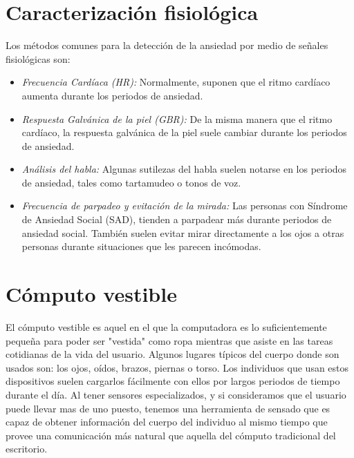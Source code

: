 \documentclass[letterpaper,12pt]{cicese}
\begin{document}
			\section{Caracterizaci\'on fisiol\'ogica}
				Los m\'etodos comunes para la detecci\'on de la ansiedad  por medio de se\~nales fisiol\'ogicas son: 
					\begin{itemize}
						\item \emph{Frecuencia Card\'iaca (HR):} Normalmente, suponen que el ritmo card\'iaco aumenta durante los periodos de ansiedad. 
						\item \emph{Respuesta Galv\'anica de la piel (GBR):} De la misma manera que el ritmo card\'iaco, la respuesta galv\'anica de la piel suele cambiar durante los periodos de ansiedad.
						\item \emph{An\'alisis del habla:} Algunas sutilezas del habla suelen notarse en los periodos de ansiedad, tales como tartamudeo o tonos de voz.
						\item \emph{Frecuencia de parpadeo y evitaci\'on de la mirada:} Las personas con S\'indrome de Ansiedad Social (SAD), tienden a parpadear m\'as durante periodos de ansiedad social. Tambi\'en suelen evitar mirar directamente a los ojos a otras personas durante situaciones que les parecen inc\'omodas\citep{Kwon2009}. 
					\end{itemize}
			\section{C\'omputo vestible}
				El c\'omputo vestible es aquel en el que la computadora es lo suficientemente peque\~na para poder ser "vestida" como ropa mientras que asiste en las
				tareas cotidianas de la vida del usuario\citep{Starner97augmentedreality}. Algunos lugares t\'ipicos del cuerpo donde son usados son: los ojos, o\'idos, brazos, piernas o torso.
				Los individuos que usan estos dispositivos suelen cargarlos f\'acilmente con ellos por largos periodos de tiempo durante el d\'ia. Al tener sensores
				especializados, y si consideramos que el usuario puede llevar mas de uno puesto, tenemos una herramienta de sensado que es capaz de obtener
				informaci\'on del cuerpo del individuo al mismo tiempo que provee una comunicaci\'on m\'as natural que aquella del c\'omputo tradicional del escritorio.
\end{document}
